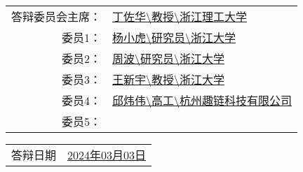 \vskip 15pt

\begin{center}
    \begin{tabularx}{.8\textwidth}{>{\fangsong}r >{\fangsong}X<{\centering}}
        答辩委员会主席： & \uline{\hfill 丁佐华\textbackslash 教授\textbackslash 浙江理工大学 \hfill} \\
        委员1： &  \uline{\hfill 杨小虎\textbackslash 研究员\textbackslash 浙江大学 \hfill} \\
        委员2： &  \uline{\hfill 周波\textbackslash 研究员\textbackslash 浙江大学 \hfill} \\
        委员3： &  \uline{\hfill 王新宇\textbackslash 教授\textbackslash 浙江大学 \hfill} \\
        委员4： &  \uline{\hfill 邱炜伟\textbackslash 高工\textbackslash 杭州趣链科技有限公司 \hfill} \\
        委员5： &  \uline{\hfill} \\
    \end{tabularx}
\end{center}

\vskip 15pt

\begin{center}
    \begin{tabularx}{.5\textwidth}{>{\fangsong}l >{\fangsong}X<{\centering}}
        答辩日期 & \uline{\hfill 2024年03月03日 \hfill}
    \end{tabularx}
\end{center}
